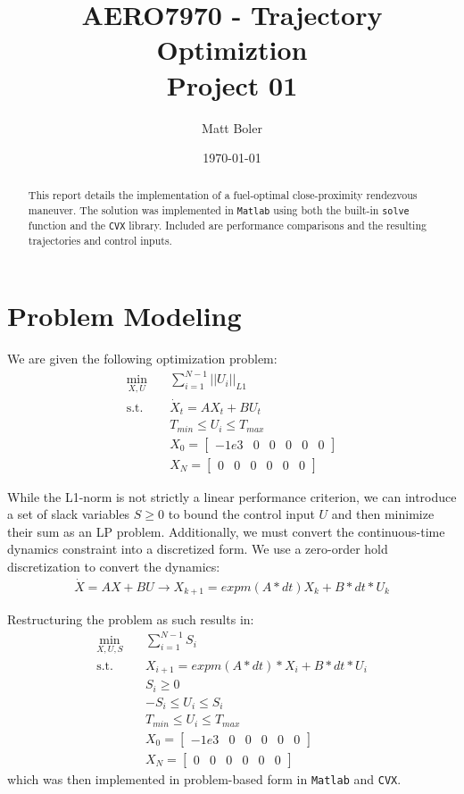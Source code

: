 \documentclass{article}
\title{AERO7970 - Trajectory Optimiztion \\ {\small Project 01}}
\author{Matt Boler}
\date{\today}
\begin{document}
\maketitle

\begin{abstract}
  This report details the implementation of a fuel-optimal close-proximity rendezvous maneuver.
  The solution was implemented in \texttt{Matlab} using both the built-in \texttt{solve} function and the \texttt{CVX} library.
  Included are performance comparisons and the resulting trajectories and control inputs.
\end{abstract}

\section{Problem Modeling}

We are given the following optimization problem:
\begin{align*}
  \min_{X, U} \quad & \sum_{i=1}^{N-1} ||U_i||_{L1} \\
  \textrm{s.t.} \quad & \dot{X}_t = AX_t + BU_t \\
  & T_{min} \leq U_{i} \leq T_{max} \\
  & X_0 = \begin{bmatrix}
    -1e3 & 0 & 0 & 0 & 0 & 0
  \end{bmatrix} \\
  & X_N = \begin{bmatrix}
    0 & 0 & 0 & 0 & 0 & 0
  \end{bmatrix}
\end{align*}

While the L1-norm is not strictly a linear performance criterion, we can introduce a set of slack variables $S \geq 0$ to bound the control input $U$ and then minimize their sum as an LP problem.
Additionally, we must convert the continuous-time dynamics constraint into a discretized form.
We use a zero-order hold discretization to convert the dynamics:
\begin{align*}
  \dot{X} = AX + BU \rightarrow X_{k+1} = expm(A*dt) X_k + B*dt * U_k
\end{align*}

Restructuring the problem as such results in:
\begin{align*}
  \min_{X, U, S} \quad & \sum_{i = 1}^{N-1} S_i \\
  \textrm{s.t.} \quad & X_{i+1} = expm(A*dt) * X_i + B*dt*U_i \\
  & S_i \geq 0 \\
  & -S_i \leq U_i \leq S_i \\
  & T_{min} \leq U_{i} \leq T_{max} \\
  & X_0 = \begin{bmatrix}
    -1e3 & 0 & 0 & 0 & 0 & 0
  \end{bmatrix} \\
  & X_N = \begin{bmatrix}
    0 & 0 & 0 & 0 & 0 & 0
  \end{bmatrix}
\end{align*}
which was then implemented in problem-based form in \texttt{Matlab} and \texttt{CVX}.
\end{document}
